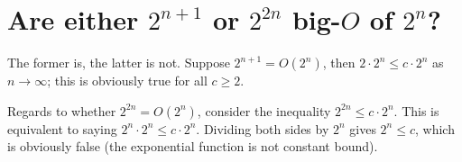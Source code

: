 \section[Problem 4]{Are either $2^{n + 1}$ or $2^{2n}$ big-$O$ of $2^n$?}

The former is, the latter is not. Suppose $2^{n + 1} = O(2^n)$, then $2 \cdot 2^n \leq c \cdot 2^n$ as $n \rightarrow \infty$; this is obviously true for all $c \geq 2$.  

Regards to whether $2^{2n} = O(2^n)$, consider the inequality $2^{2n} \leq c \cdot 2^n$. This is equivalent to saying $2^n \cdot 2^n \leq c \cdot 2^n$. Dividing both sides by $2^n$ gives $2^n \leq c$, which is obviously false (the exponential function is not constant bound).
